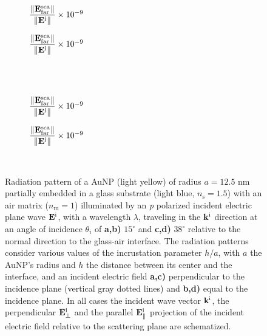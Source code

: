 \begin{figure}[h!]
    \centering
    \def\svgwidth{.8\textwidth}
    \hspace*{-.2\textwidth}%
    \vspace*{-3.65em}%
        \begin{subfigure}{.375\textwidth}\caption{%
                    \footnotesize$\dfrac{\norm{\vb{E}^\text{sca}_\text{far}}}{\norm{\vb{E}^\text{i}}} \times 10^{-9}$  }\label{sfig:Far:Inc:p1:a}\end{subfigure}%
        \begin{subfigure}{.4\textwidth}\caption{%
                    \footnotesize$\dfrac{\norm{\vb{E}^\text{sca}_\text{far}}}{\norm{\vb{E}^\text{i}}} \times 10^{-9}$  }\label{sfig:Far:Inc:p1:b}\end{subfigure}\\
    \\[-.75em]
    \def\svgwidth{.8\textwidth}
    \hspace*{-.21\textwidth}%
    \vspace*{-.7em}%
        \begin{subfigure}{.4\textwidth}\caption{%
                    \footnotesize$\dfrac{\norm{\vb{E}^\text{sca}_\text{far}}}{\norm{\vb{E}^\text{i}}} \times 10^{-9}$  }\label{sfig:Far:Inc:p1:c}\end{subfigure}%
        \begin{subfigure}{.4\textwidth}\caption{%
                    \footnotesize$\dfrac{\norm{\vb{E}^\text{sca}_\text{far}}}{\norm{\vb{E}^\text{i}}} \times 10^{-9}$  }\label{sfig:Far:Inc:p1:d}\end{subfigure}\\
    \caption[  Radiation pattern of a AuNP supported on a substrate illuminated at oblique incidence ]{
    Radiation pattern of a AuNP (light yellow) of radius $a = 12.5$ nm partially embedded in a glass substrate (light blue, $n_\text{s} = 1.5$) with an air matrix ($n_\text{m} = 1$) illuminated by an \textit{p} polarized incident electric plane wave $\vb{E}^\text{i}$, with a wavelength $\lambda$, traveling in the $\vb{k}^\text{i}$ direction at an angle of incidence $\theta_i$ of \textbf{a,b)} $15^\circ$ and \textbf{c,d)} $38^\circ$ relative to the normal direction to the glass-air interface. The radiation patterns consider various values of the incrustation parameter $h/a$, with $a$ the AuNP's radius and $h$ the distance between its center and the interface, and an  incident electric field \textbf{a,c)} perpendicular to the incidence plane (vertical gray dotted lines) and \textbf{b,d)} equal to the incidence plane. In all cases the incident wave vector $\vb{k}^\text{i}$, the perpendicular $\vb{E}_\perp^\text{i}$ and the  parallel $\vb{E}_\parallel^\text{i}$ projection of the incident electric field relative to the scattering plane are schematized.%
    }
    \label{fig:Far:Inc:p1}
\end{figure}


